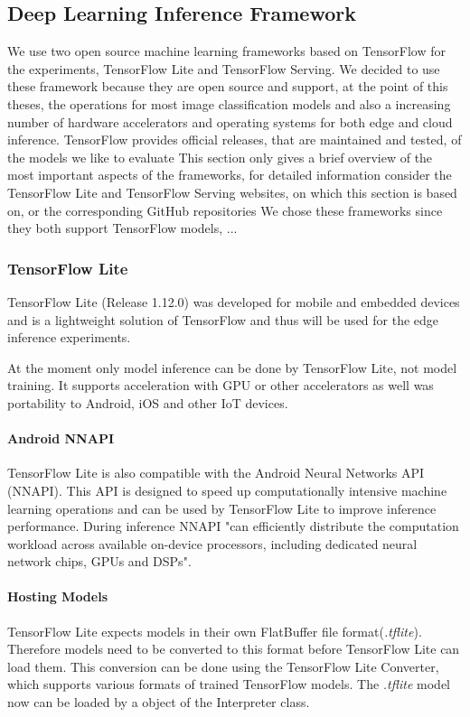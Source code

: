 \subsection{Deep Learning Inference Framework}
We use two open source machine learning frameworks based on TensorFlow for the experiments, TensorFlow Lite and TensorFlow Serving. We decided to use these framework because they are open source and support, at the point of this theses, the operations for most image classification models and also a increasing number of hardware accelerators and operating systems for both edge and cloud inference.
TensorFlow provides official releases, that are maintained and tested, of the models we like to evaluate
This section only gives a brief overview of the most important aspects of the frameworks, for detailed information consider the TensorFlow Lite\cite{tfLite}  and TensorFlow Serving\cite{tfServing} websites, on which this section is based on, or the corresponding GitHub repositories
We chose these frameworks since they both support TensorFlow models, ...%
\subsubsection{TensorFlow Lite}
\label{chap:TFLite}
TensorFlow Lite (Release 1.12.0) was developed for mobile and embedded devices and is a lightweight solution of TensorFlow and thus will be used for the edge inference experiments.

At the moment only model inference can be done by TensorFlow Lite, not model training.
It supports acceleration with GPU or other accelerators as well was portability to Android, iOS and other IoT devices.

\paragraph{Android NNAPI}
\label{chap:NNAPI}
TensorFlow Lite is also compatible with the Android Neural Networks API (NNAPI). This API
is designed to speed up computationally intensive machine learning operations and can be used by TensorFlow Lite to improve inference performance. During inference NNAPI "can
efficiently distribute the computation workload across available on-device processors, including dedicated neural network chips, GPUs and DSPs"\cite{DBLP:journals/corr/abs-1810-01109}.



\paragraph{Hosting Models}
TensorFlow Lite expects models in their own FlatBuffer file  format(\emph{.tflite}). Therefore models need to be converted to this format before TensorFlow Lite can load them. This conversion can be done using the TensorFlow Lite Converter, which supports various formats of trained TensorFlow models.
The \emph{.tflite} model now can be loaded by a object of the Interpreter class.
